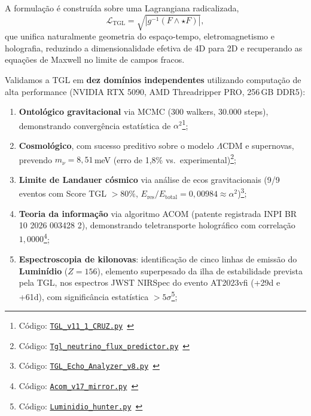 \documentclass[12pt,a4paper,twoside]{article}
\newcommand{\alphaii}{\alpha^{2}}
\newcommand{\Ltgl}{\mathcal{L}_{\text{TGL}}}
\begin{document}
A formula\c{c}\~ao \'e constru\'ida sobre uma Lagrangiana radicalizada,
\begin{equation*}
\Ltgl = \sqrt{\left|g^{-1}(F \wedge \star F)\right|},
\end{equation*}
que unifica naturalmente geometria do espa\c{c}o-tempo, eletromagnetismo e holografia, reduzindo a dimensionalidade efetiva de 4D para 2D e recuperando as equa\c{c}\~oes de Maxwell no limite de campos fracos.

Validamos a TGL em \textbf{dez dom\'inios independentes} utilizando computa\c{c}\~ao de alta performance (NVIDIA RTX 5090, AMD Threadripper PRO, 256\,GB DDR5):

\begin{enumerate}[label=(\arabic*),nosep]
\item \textbf{Ontol\'ogico gravitacional} via MCMC (300 walkers, 30.000 steps), demonstrando converg\^encia estat\'istica de $\alphaii$\footnote{C\'odigo: \texttt{\href{https://github.com/rotolimiguel-iald/the_boundary/blob/main/TGL_v11_1_CRUZ.py}{TGL\_v11\_1\_CRUZ.py}}\ \cite{Miguel2026GitHub}};
\item \textbf{Cosmol\'ogico}, com sucesso preditivo sobre o modelo $\Lambda$CDM e supernovas, prevendo $m_\nu = 8{,}51$\,meV (erro de 1,8\% vs.\ experimental)\footnote{C\'odigo: \texttt{\href{https://github.com/rotolimiguel-iald/the_boundary/blob/main/Tgl_neutrino_flux_predictor.py}{Tgl\_neutrino\_flux\_predictor.py}}\ \cite{Miguel2026GitHub}};
\item \textbf{Limite de Landauer c\'osmico} via an\'alise de ecos gravitacionais (9/9 eventos com Score TGL $> 80\%$, $E_{\text{res}}/E_{\text{total}} = 0{,}00984 \approx \alphaii$)\footnote{C\'odigo: \texttt{\href{https://github.com/rotolimiguel-iald/the_boundary/blob/main/TGL_Echo_Analyzer_v8.py}{TGL\_Echo\_Analyzer\_v8.py}}\ \cite{Miguel2026GitHub}}; 
\item \textbf{Teoria da informa\c{c}\~ao} via algoritmo ACOM (patente registrada INPI BR 10 2026 003428 2), demonstrando teletransporte hologr\'afico com correla\c{c}\~ao $1{,}0000$\footnote{C\'odigo: \texttt{\href{https://github.com/rotolimiguel-iald/the_boundary/blob/main/Acom_v17_mirror.py}{Acom\_v17\_mirror.py}}\ \cite{Miguel2026GitHub}}; 
\item \textbf{Espectroscopia de kilonovas}: identifica\c{c}\~ao de cinco linhas de emiss\~ao do \textbf{Lumin\'idio} ($Z = 156$), elemento superpesado da ilha de estabilidade prevista pela TGL, nos espectros JWST NIRSpec do evento AT2023vfi (+29d e +61d), com signific\^ancia estat\'istica $> 5\sigma$\footnote{C\'odigo: \texttt{\href{https://github.com/rotolimiguel-iald/the_boundary/blob/main/Luminidio_hunter.py}{Luminidio\_hunter.py}}\ \cite{Miguel2026GitHub}}; 

\end{enumerate}
\end{document}
